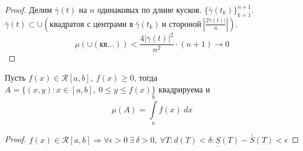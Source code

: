 \begin{proof}
    Делим $\bar{\gamma}(t)$ на $n$ одинаковых по длине кусков. $\{\bar{\gamma}(t_k)\}_{k=1}^{n+1}$. $\bar{\gamma}(t)\subset \cup(\text{квадратов с центрами в}\  \bar{\gamma}(t_k)\ \text{и стороной}\ |\frac{2\bar{\gamma}(t)|}{n}|)$. 
    \[\mu(\cup(\text{кв...}))<\frac{4|\bar{\gamma}(t)|^2}{n^2}\cdot (n+1)\to 0\]
\end{proof} 
\begin{theorem}
    Пусть $f(x)\in \mathcal{R}[a,b],\ f(x)\geq 0$, тогда $A=\{(x,y): x\in[a,b],\ 0\leq y\leq f(x)\}$ квадрируема и 
    \[\mu(A)=\int\limits_{a}^{b}f(x)\ dx\]
\end{theorem} 
\begin{proof}
    $f(x)\in \mathcal{R}[a,b] \Rightarrow \forall \epsilon>0\ \exists\ \delta>0,\ \forall T: d(T)<\delta: \underline{\underline{S}}(T)-\overline{\overline{S}}(T)<\epsilon$
\end{proof} 